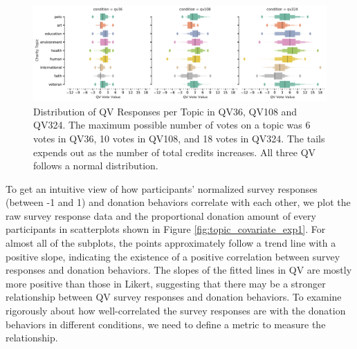 \begin{figure}[htpb]
    \centering
    \includegraphics[width=\textwidth, keepaspectratio=true]{content/image/qv_distribution_per_topic.pdf}
    \caption{
      Distribution of QV Responses per Topic in QV36, QV108 and QV324. 
      The maximum possible number of votes on a topic was 6 votes in QV36, 10 votes in QV108, and 18 votes in QV324.
      The tails expends out as the number of total credits increases. 
      All three QV follows a normal distribution.
    }
    \label{fig:qv3_exp1}
\end{figure}

To get an intuitive view of how participants' normalized survey responses (between -1 and 1) and donation behaviors correlate with each other, we plot the raw survey response data and the proportional donation amount of every participants in scatterplots shown in Figure \ref{fig:topic_covariate_exp1}. For almost all of the subplots, the points approximately follow a trend line with a positive slope, indicating the existence of a positive correlation between survey responses and donation behaviors. The slopes of the fitted lines in QV are mostly more positive than those in Likert, suggesting that there may be a stronger relationship between QV survey responses and donation behaviors. To examine rigorously about how well-correlated the survey responses are with the donation behaviors in different conditions, we need to define a metric to measure the relationship.

